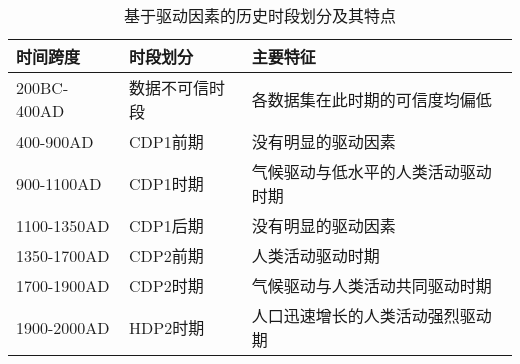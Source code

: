 \begin{table}[htbp]
    \centering
    \caption{基于驱动因素的历史时段划分及其特点}
      \begin{tabularx}{\textwidth}{LLL}
      \toprule
      时间跨度  & 时段划分  & 主要特征 \\
      \midrule
      200BC-400AD & 数据不可信时段 & 各数据集在此时期的可信度均偏低 \\
      400-900AD & CDP1前期 & 没有明显的驱动因素 \\
      900-1100AD & CDP1时期 & 气候驱动与低水平的人类活动驱动时期 \\
      1100-1350AD & CDP1后期 & 没有明显的驱动因素 \\
      1350-1700AD & CDP2前期 & 人类活动驱动时期 \\
      1700-1900AD & CDP2时期 & 气候驱动与人类活动共同驱动时期 \\
      1900-2000AD & HDP2时期 & 人口迅速增长的人类活动强烈驱动期 \\
      \bottomrule
      \end{tabularx}%
    \label{tab:ch3:periods_division}%
\end{table}%
  